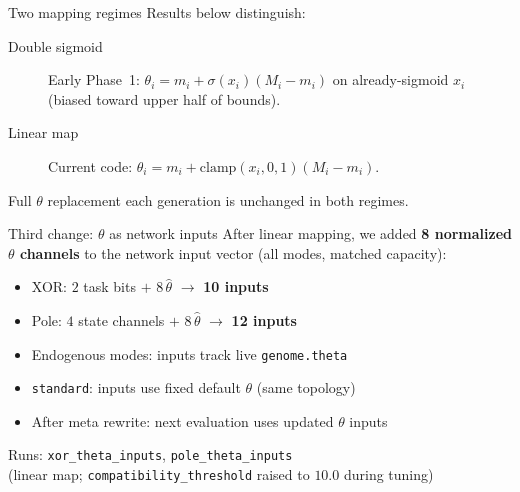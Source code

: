 \documentclass[aspectratio=169,11pt]{beamer}
\begin{document}
\begin{frame}{Two mapping regimes}
  Results below distinguish:

  \vspace{0.5em}
  \begin{description}
    \item[Double sigmoid] Early Phase~1: $\theta_i = m_i + \sigma(x_i)(M_i-m_i)$
      on already-sigmoid $x_i$ (biased toward upper half of bounds).
    \item[Linear map] Current code: $\theta_i = m_i + \mathrm{clamp}(x_i,0,1)(M_i-m_i)$.
  \end{description}

  \vspace{0.6em}
  Full $\theta$ replacement each generation is unchanged in both regimes.
\end{frame}

\begin{frame}{Third change: $\theta$ as network inputs}
  After linear mapping, we added \textbf{8 normalized $\theta$ channels} to the
  network input vector (all modes, matched capacity):

  \vspace{0.5em}
  \begin{itemize}
    \item XOR: $2$ task bits $+$ $8\,\hat\theta$ $\rightarrow$ \textbf{10 inputs}
    \item Pole: $4$ state channels $+$ $8\,\hat\theta$ $\rightarrow$ \textbf{12 inputs}
    \item Endogenous modes: inputs track live \texttt{genome.theta}
    \item \texttt{standard}: inputs use fixed default $\theta$ (same topology)
    \item After meta rewrite: next evaluation uses updated $\theta$ inputs
  \end{itemize}

  \vspace{0.6em}
  Runs: \texttt{xor\_theta\_inputs}, \texttt{pole\_theta\_inputs}\\
  (linear map; \texttt{compatibility\_threshold} raised to $10.0$ during tuning)
\end{frame}
\end{document}
